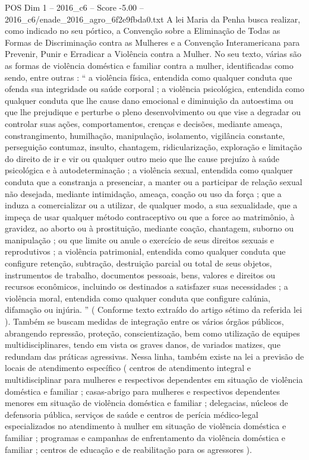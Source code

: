 \begin{textsample}{POS Dim 1 – 2016\_c6 – Score -5.00 – 2016\_c6/enade\_2016\_agro\_6f2e9fbda0.txt}
A lei Maria da Penha busca realizar, como indicado no seu pórtico, a Convenção sobre a Eliminação de Todas as Formas de Discriminação contra as Mulheres e a Convenção Interamericana para Prevenir, Punir e Erradicar a Violência contra a Mulher.
No seu texto, várias são as formas de violência doméstica e familiar contra a mulher, identificadas como sendo, entre outras : “ a violência física, entendida como qualquer conduta que ofenda sua integridade ou saúde corporal ; a violência psicológica, entendida como qualquer conduta que lhe cause dano emocional e diminuição da autoestima ou que lhe prejudique e perturbe o pleno desenvolvimento ou que vise a degradar ou controlar suas ações, comportamentos, crenças e decisões, mediante ameaça, constrangimento, humilhação, manipulação, isolamento, vigilância constante, perseguição contumaz, insulto, chantagem, ridicularização, exploração e limitação do direito de ir e vir ou qualquer outro meio que lhe cause prejuízo à saúde psicológica e à autodeterminação ; a violência sexual, entendida como qualquer conduta que a constranja a presenciar, a manter ou a participar de relação sexual não desejada, mediante intimidação, ameaça, coação ou uso da força ; que a induza a comercializar ou a utilizar, de qualquer modo, a sua sexualidade, que a impeça de usar qualquer método contraceptivo ou que a force ao matrimônio, à gravidez, ao aborto ou à prostituição, mediante coação, chantagem, suborno ou manipulação ; ou que limite ou anule o exercício de seus direitos sexuais e reprodutivos ; a violência patrimonial, entendida como qualquer conduta que configure retenção, subtração, destruição parcial ou total de seus objetos, instrumentos de trabalho, documentos pessoais, bens, valores e direitos ou recursos econômicos, incluindo os destinados a satisfazer suas necessidades ; a violência moral, entendida como qualquer conduta que configure calúnia, difamação ou injúria. ” ( Conforme texto extraído do artigo sétimo da referida lei ).
Também se buscam medidas de integração entre os vários órgãos públicos, abrangendo repressão, proteção, conscientização, bem como utilização de equipes multidisciplinares, tendo em vista os graves danos, de variados matizes, que redundam das práticas agressivas.
Nessa linha, também existe na lei a previsão de locais de atendimento específico ( centros de atendimento integral e multidisciplinar para mulheres e respectivos dependentes em situação de violência doméstica e familiar ; casas-abrigo para mulheres e respectivos dependentes menores em situação de violência doméstica e familiar ; delegacias, núcleos de defensoria pública, serviços de saúde e centros de perícia médico-legal especializados no atendimento à mulher em situação de violência doméstica e familiar ; programas e campanhas de enfrentamento da violência doméstica e familiar ; centros de educação e de reabilitação para os agressores ).

\end{textsample}

